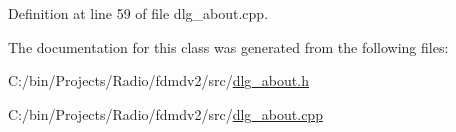 Definition at line 59 of file dlg\-\_\-about.\-cpp.



The documentation for this class was generated from the following files\-:\begin{DoxyCompactItemize}
\item 
C\-:/bin/\-Projects/\-Radio/fdmdv2/src/\hyperlink{dlg__about_8h}{dlg\-\_\-about.\-h}\item 
C\-:/bin/\-Projects/\-Radio/fdmdv2/src/\hyperlink{dlg__about_8cpp}{dlg\-\_\-about.\-cpp}\end{DoxyCompactItemize}
